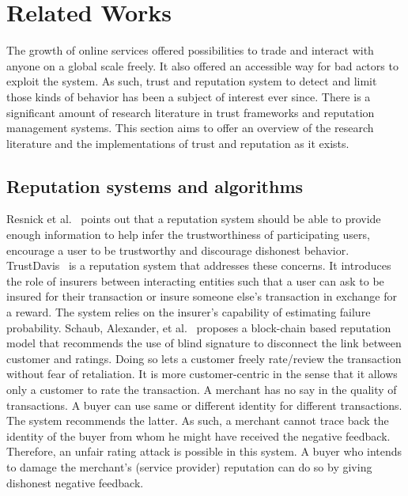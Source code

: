 \chapter{Related Works}\label{ch:litrev}
The growth of online services offered possibilities to trade and interact with
anyone on a global scale freely. It also offered an accessible way for bad
actors to exploit the system. As such, trust and reputation system to detect
and limit those kinds of behavior has been a subject of interest ever since.
There is a significant amount of research literature in trust frameworks and
reputation management systems. This section aims to offer an overview of the
research literature and the implementations of trust and reputation as it
exists. 
\section{Reputation systems and algorithms}
Resnick et al.~\cite{resnick2000reputation} points out that a reputation system
should be able to provide enough information to help infer the trustworthiness
of participating users, encourage a user to be trustworthy and discourage
dishonest behavior. TrustDavis~\cite{defigueiredo2005trustdavis} is a
reputation system that addresses these concerns. It introduces the role of
insurers between interacting entities such that a user can ask to be insured
for their transaction or insure someone else's transaction in exchange for a
reward. The system relies on the insurer's capability of estimating failure
probability. Schaub, Alexander, et al.~\cite{schaub2016trustless} proposes a
block-chain based reputation model that recommends the use of blind signature
to disconnect the link between customer and ratings. Doing so lets a customer
freely rate/review the transaction without fear of retaliation. It is more
customer-centric in the sense that it allows only a customer to rate the
transaction. A merchant has no say in the quality of transactions. A buyer can
use same or different identity for different transactions. The system
recommends the latter. As such, a merchant cannot trace back the identity of
the buyer from whom he might have received the negative feedback. Therefore, an
unfair rating attack is possible in this system. A buyer who intends to damage
the merchant's (service provider) reputation can do so by giving dishonest
negative feedback. \par

